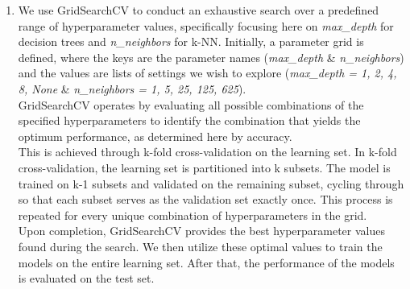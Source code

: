 \documentclass[acmconf,nonacm=true]{acmart}
\begin{document}
\begin{enumerate}
    \item We use GridSearchCV to conduct an exhaustive search over a predefined range of hyperparameter values, specifically focusing here on \textit{max\_depth} for decision trees and \textit{n\_neighbors} for k-NN. Initially, a parameter grid is defined, where the keys are the parameter names (\textit{max\_depth} \& \textit{n\_neighbors}) and the values are lists of settings we wish to explore (\textit{max\_depth = 1, 2, 4, 8, None} \& \textit{n\_neighbors = 1, 5, 25, 125, 625}).\\
    
    GridSearchCV operates by evaluating all possible combinations of the specified hyperparameters to identify the combination that yields the optimum performance, as determined here by accuracy.\\
    
    This is achieved through k-fold cross-validation on the learning set. In k-fold cross-validation, the learning set is partitioned into k subsets. The model is trained on k-1 subsets and validated on the remaining subset, cycling through so that each subset serves as the validation set exactly once. This process is repeated for every unique combination of hyperparameters in the grid.\\
    
    Upon completion, GridSearchCV provides the best hyperparameter values found during the search. We then utilize these optimal values to train the models on the entire learning set. After that, the performance of the models is evaluated on the test set.\\
    

\end{enumerate}
\end{document}
